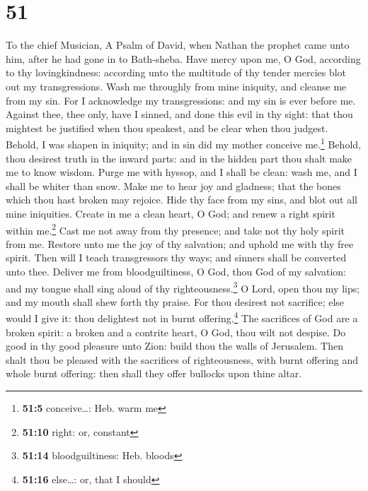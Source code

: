 \hypertarget{section-50}{%
\section{51}\label{section-50}}

To the chief Musician, A Psalm of David, when Nathan the prophet came
unto him, after he had gone in to Bath-sheba.  Have mercy
upon me, O God, according to thy lovingkindness: according unto the
multitude of thy tender mercies blot out my transgressions.
 Wash me throughly from mine iniquity, and cleanse me from
my sin.  For I acknowledge my transgressions: and my sin
is ever before me.  Against thee, thee only, have I
sinned, and done this evil in thy sight: that thou mightest be justified
when thou speakest, and be clear when thou judgest. 
Behold, I was shapen in iniquity; and in sin did my mother conceive
me.\footnote{\textbf{51:5} conceive\ldots: Heb. warm me} 
Behold, thou desirest truth in the inward parts: and in the hidden part
thou shalt make me to know wisdom.  Purge me with hyssop,
and I shall be clean: wash me, and I shall be whiter than snow.
 Make me to hear joy and gladness; that the bones which
thou hast broken may rejoice.  Hide thy face from my sins,
and blot out all mine iniquities.  Create in me a clean
heart, O God; and renew a right spirit within me.\footnote{\textbf{51:10}
  right: or, constant}  Cast me not away from thy
presence; and take not thy holy spirit from me.  Restore
unto me the joy of thy salvation; and uphold me with thy free spirit.
 Then will I teach transgressors thy ways; and sinners
shall be converted unto thee.  Deliver me from
bloodguiltiness, O God, thou God of my salvation: and my tongue shall
sing aloud of thy righteousness.\footnote{\textbf{51:14}
  bloodguiltiness: Heb. bloods}  O Lord, open thou my
lips; and my mouth shall shew forth thy praise.  For thou
desirest not sacrifice; else would I give it: thou delightest not in
burnt offering.\footnote{\textbf{51:16} else\ldots: or, that I should}
 The sacrifices of God are a broken spirit: a broken and
a contrite heart, O God, thou wilt not despise.  Do good
in thy good pleasure unto Zion: build thou the walls of Jerusalem.
 Then shalt thou be pleased with the sacrifices of
righteousness, with burnt offering and whole burnt offering: then shall
they offer bullocks upon thine altar.

